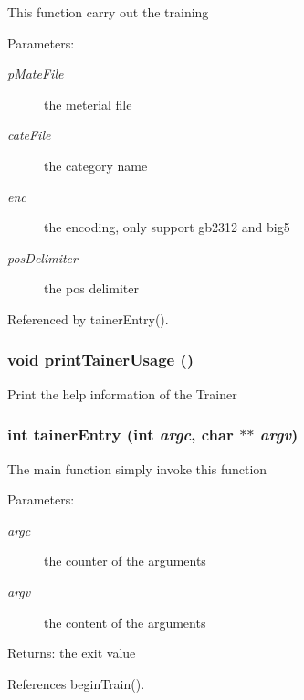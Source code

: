 This function carry out the training

\begin{Desc}
\item[Parameters:]
\begin{description}
\item[{\em pMateFile}]the meterial file \item[{\em cateFile}]the category name \item[{\em enc}]the encoding, only support gb2312 and big5 \item[{\em posDelimiter}]the pos delimiter \end{description}
\end{Desc}


Referenced by tainerEntry().
\subsubsection[{printTainerUsage}]{\setlength{\rightskip}{0pt plus 5cm}void printTainerUsage ()}\label{TrainerCMD_8h_cadfbf3ad2e202a3d175a59bac8079a1}


Print the help information of the Trainer 
\subsubsection[{tainerEntry}]{\setlength{\rightskip}{0pt plus 5cm}int tainerEntry (int {\em argc}, \/  char $\ast$$\ast$ {\em argv})}\label{TrainerCMD_8h_16127519ffec951fcf4cf053c2a573a5}


The main function simply invoke this function

\begin{Desc}
\item[Parameters:]
\begin{description}
\item[{\em argc}]the counter of the arguments \item[{\em argv}]the content of the arguments \end{description}
\end{Desc}
\begin{Desc}
\item[Returns:]the exit value \end{Desc}


References beginTrain().